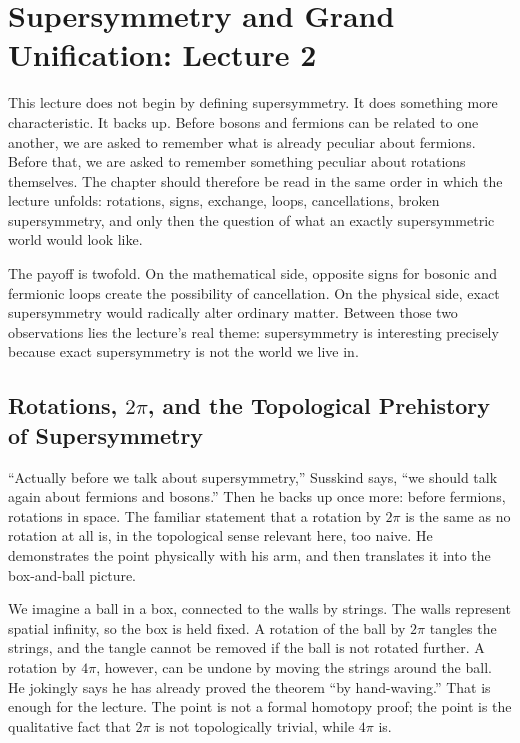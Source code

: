 \chapter{Supersymmetry and Grand Unification: Lecture 2}

This lecture does not begin by defining supersymmetry. It does something more characteristic. It backs up. Before bosons and fermions can be related to one another, we are asked to remember what is already peculiar about fermions. Before that, we are asked to remember something peculiar about rotations themselves. The chapter should therefore be read in the same order in which the lecture unfolds: rotations, signs, exchange, loops, cancellations, broken supersymmetry, and only then the question of what an exactly supersymmetric world would look like.

The payoff is twofold. On the mathematical side, opposite signs for bosonic and fermionic loops create the possibility of cancellation. On the physical side, exact supersymmetry would radically alter ordinary matter. Between those two observations lies the lecture's real theme: supersymmetry is interesting precisely because exact supersymmetry is not the world we live in.

\section{Rotations, \(2\pi\), and the Topological Prehistory of Supersymmetry}

``Actually before we talk about supersymmetry,'' Susskind says, ``we should talk again about fermions and bosons.'' Then he backs up once more: before fermions, rotations in space. The familiar statement that a rotation by \(2\pi\) is the same as no rotation at all is, in the topological sense relevant here, too naive. He demonstrates the point physically with his arm, and then translates it into the box-and-ball picture.

We imagine a ball in a box, connected to the walls by strings. The walls represent spatial infinity, so the box is held fixed. A rotation of the ball by \(2\pi\) tangles the strings, and the tangle cannot be removed if the ball is not rotated further. A rotation by \(4\pi\), however, can be undone by moving the strings around the ball. He jokingly says he has already proved the theorem ``by hand-waving.'' That is enough for the lecture. The point is not a formal homotopy proof; the point is the qualitative fact that \(2\pi\) is not topologically trivial, while \(4\pi\) is.

